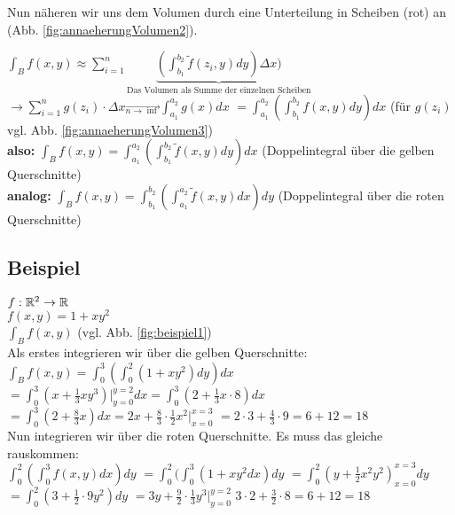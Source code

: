 
Nun näheren wir uns dem Volumen durch eine Unterteilung in Scheiben (rot) an (Abb. \ref{fig:annaeherungVolumen2}).

$ \int_{B} f(x,y) \approx \sum_{i=1}^{n} \underbrace{( \int_{b_1}^{b_2} \tilde{f} (z_i,y) dy ) \Delta x)}_{\textrm{Das Volumen als Summe der einzelnen Scheiben}} $
$ \rightarrow \sum_{i=1}^{n} g(z_i)\cdot \Delta x \overrightarrow{ _{n\rightarrow \inf}} \int_{a_1}^{a_2} g(x) dx $ 
$ = \int_{a_1}^{a_2} ( \int_{b_1}^{b_2} f(x,y)dy)dx $ (für $ g(z_i) $ vgl. Abb. \ref{fig:annaeherungVolumen3})\\
\textbf{also:}
$ \int_{B} f(x,y) = \int_{a_1}^{a_2} ( \int_{b_1}^{b_2} \tilde{f}(x,y)dy)dx $ (Doppelintegral über die gelben Querschnitte)\\

\textbf{analog:}
$ \int_{B} f(x,y) = \int_{b_1}^{b_2} ( \int_{a_1}^{a_2} \tilde{f}(x,y)dx ) dy $ (Doppelintegral über die roten Querschnitte)

\subsection{Beispiel} 

$ f: \mathbb{R}^2 \rightarrow \mathbb{R} $\\
$ f(x,y) = 1+xy^2 $\\
$ \int_B f(x,y) $ (vgl. Abb. \ref{fig:beispiel1})\\
Als erstes integrieren wir über die gelben Querschnitte:\\
$ \int_{B} f(x,y) = \int_0^3 ( \int_0^2 (1+xy^2) dy ) dx $
$ = \int_0^3 (x + \frac{1}{3} xy^3)|_{y=0}^{y=2} dx = \int_0^3 (2+\frac{1}{3} x\cdot 8) dx $
$ = \int_0^3 (2+ \frac{8}{3} x) dx = 2x+\frac{8}{3} \cdot \frac{1}{2} x^2 |_{x=0}^{x=3} $
$ = 2\cdot 3 + \frac{4}{3} \cdot 9 = 6+12=18 $\\
Nun integrieren wir über die roten Querschnitte. Es muss das gleiche rauskommen: \\
$ \int_0^2 ( \int_0^3 f(x,y)dx)dy $
$ = \int_0^2 ( \int_0^3 (1+xy^2 dx) dy $
$ = \int_0^2 ( y+\frac{1}{2}x^2y^2)_{x=0}^{x=3} dy $
$ = \int_0^2 (3+\frac{1}{2}\cdot 9 y^2)dy $
$ = 3y + \frac{9}{2} \cdot \frac{1}{3} y^3 |_{y=0}^{y=2} $
$ 3\cdot 2 + \frac{3}{2} \cdot 8 = 6+12=18 $


